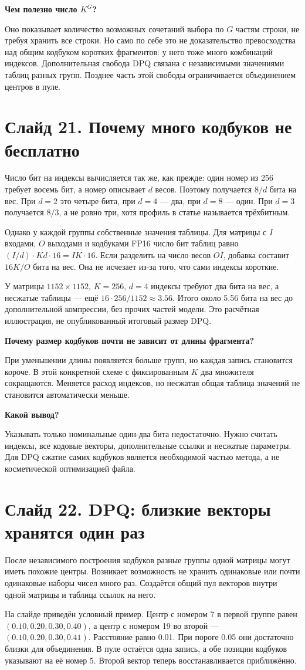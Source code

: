 \documentclass[a4paper,11pt]{article}
\newcommand{\slide}[2]{\clearpage\section*{Слайд #1. #2}}
\newcommand{\question}[1]{\par\textbf{#1}\par}
\begin{document}
\question{Чем полезно число $K^G$?}
Оно показывает количество возможных сочетаний выбора
по $G$ частям строки, не требуя хранить все строки.
Но само по себе это не доказательство превосходства
над общим кодбуком коротких фрагментов: у него тоже
много комбинаций индексов. Дополнительная свобода DPQ
связана с независимыми значениями таблиц разных групп.
Позднее часть этой свободы ограничивается объединением центров в пуле.

\slide{21}{Почему много кодбуков не бесплатно}
Число бит на индексы вычисляется так же, как прежде:
один номер из 256 требует восемь бит, а номер описывает
$d$ весов. Поэтому получается $8/d$ бита на вес.
При $d=2$ это четыре бита, при $d=4$ --- два,
при $d=8$ --- один. При $d=3$ получается $8/3$,
а не ровно три, хотя профиль в статье называется трёхбитным.

Однако у каждой группы собственные значения таблицы.
Для матрицы с $I$ входами, $O$ выходами и кодбуками FP16
число бит таблиц равно $(I/d)\cdot Kd\cdot16=IK\cdot16$.
Если разделить на число весов $OI$, добавка составит
$16K/O$ бита на вес. Она не исчезает из-за того,
что сами индексы короткие.

У матрицы $1152\times1152$, $K=256$, $d=4$
индексы требуют два бита на вес, а несжатые таблицы ---
ещё $16\cdot256/1152\approx3.56$.
Итого около 5.56 бита на вес до дополнительной компрессии,
без прочих частей модели. Это расчётная иллюстрация,
не опубликованный итоговый размер DPQ.

\question{Почему размер кодбуков почти не зависит от длины фрагмента?}
При уменьшении длины появляется больше групп,
но каждая запись становится короче. В этой конкретной
схеме с фиксированным $K$ два множителя сокращаются.
Меняется расход индексов, но несжатая общая таблица значений
не становится автоматически меньше.

\question{Какой вывод?}
Указывать только номинальные один-два бита недостаточно.
Нужно считать индексы, все кодовые векторы, дополнительные
ссылки и несжатые параметры. Для DPQ сжатие самих кодбуков
является необходимой частью метода, а не косметической оптимизацией файла.

\slide{22}{DPQ: близкие векторы хранятся один раз}
После независимого построения кодбуков разные группы
одной матрицы могут иметь похожие центры.
Возникает возможность не хранить одинаковые или почти
одинаковые наборы чисел много раз. Создаётся общий пул
векторов внутри одной матрицы и таблица ссылок на него.

На слайде приведён условный пример. Центр с номером 7
в первой группе равен $(0.10,0.20,0.30,0.40)$,
а центр с номером 19 во второй --- $(0.10,0.20,0.30,0.41)$.
Расстояние равно 0.01. При пороге 0.05 они достаточно
близки для объединения. В пуле остаётся одна запись,
а обе позиции кодбуков указывают на её номер 5.
Второй вектор теперь восстанавливается приближённо.
\end{document}
